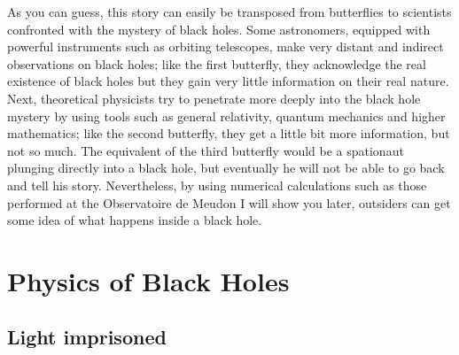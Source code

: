 \documentclass[12pt]{article}
\begin{document}
As you can guess, this story can easily be transposed from butterflies to
scientists confronted with the mystery of black holes. Some
astronomers, equipped with powerful instruments such as orbiting telescopes,
make very distant and indirect observations on black holes; like the first
butterfly, they acknowledge the real existence of black holes but they gain
very little information on their real nature. Next, theoretical physicists try
to penetrate more deeply into the black hole mystery by using tools such as
general relativity, quantum mechanics and higher mathematics; like the second
butterfly, they get a little bit more information, but not so much. The
equivalent of the third butterfly would be a spationaut plunging directly into
a black hole, but eventually he will not be able to go back and tell his story.
Nevertheless, by using numerical calculations such as those performed at the
Observatoire de Meudon I will show you later, outsiders can get some idea of what
happens inside a black hole. 

\section {Physics of Black Holes}

\subsection {Light imprisoned}
 
\end{document}

